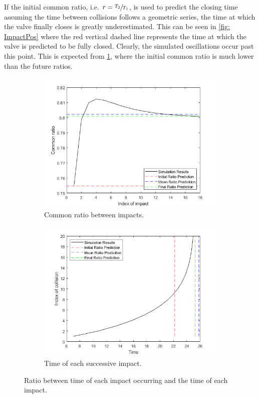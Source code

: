 \newpage
If the initial common ratio, i.e. $r = \sfrac{T_2}{T_1}$, is used to predict the closing time assuming the time between collisions follows a geometric series, the time at which the valve finally closes is greatly underestimated. This can be seen in \cref{fig: ImpactPos} where the red vertical dashed line represents the time at which the valve is predicted to be fully closed. Clearly, the simulated oscillations occur past this point. This is expected from \cref{fig: ImpactOtherRatio}, where the initial common ratio is much lower than the future ratios.
~
\begin{figure}[ht]
    \centering
    \begin{subfigure}{0.49\textwidth}
    \includegraphics[width=\textwidth]{Figures/ImpactSeries/CommonRatio.png}
    \caption{Common ratio between impacts.}
    \label{fig: ImpactOtherRatio}
    \end{subfigure}
    \begin{subfigure}{0.49\textwidth}
    \includegraphics[width=\textwidth]{Figures/ImpactSeries/FinalTime.png}
    \caption{Time of each successive impact.}
    \label{fig: ImpactOtherTimes}
    \end{subfigure}
    \caption{Ratio between time of each impact occurring and the time of each impact.}
    \label{fig: ImpactOther}
\end{figure}

